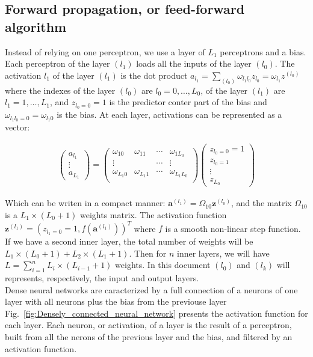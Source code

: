 \documentclass[final, paper=letter,5p,times,twocolumn]{elsarticle}
\begin{document}
\subsection{Forward propagation, or feed-forward algorithm}
Instead of relying on one perceptron, we use a layer of $L_{1}$ perceptrons and a bias. Each perceptron of the layer $(l_{1})$ loads all the inputs of the layer $(l_{0})$. The activation $l_{1}$ of the layer $(l_{1})$ is the dot product $a_{l_{1}} = \sum_{(l_{0})} \omega_{l_{1}l_{0}}z_{l_{0}} = \omega_{l_{1}}z^{(l_{0})}$ where the indexes of the layer $(l_{0})$ are $l_{0} = 0, \dots, L_{0}$, of the layer $(l_{1})$ are $l_{1} = 1, \dots, L_{1}$, and $z_{l_{0} = 0} = 1$ is the predictor conter part of the bias and $\omega_{l_{1}l_{0} = 0} = \omega_{l_{1}0}$ is the bias. At each layer, activations can be represented as a vector:

\begin{eqnarray*}
  \left(
  \begin{array}{c}
    a_{l_{1}} \\
    \vdots \\
    a_{L_{1}}
  \end{array}
  \right) = \left(
  \begin{array}{cccc}
    \omega_{10} & \omega_{11} & \cdots & \omega_{1L_{0}} \\
    \vdots     &            & \cdots & \vdots \\
    \omega_{L_{1}0} & \omega_{L_{1}1} & \cdots & \omega_{L_{1}L_{0}} \\
  \end{array}
  \right)  \left(
  \begin{array}{c}
    z_{l_{0} = 0} = 1 \\
    z_{l_{0} = 1} \\
    \vdots \\
    z_{L_{0}} 
  \end{array}
  \right)
\end{eqnarray*}

Which can be writen in a compact manner: $\bm{a}^{(l_{1})} = \Omega_{10}\bm{z}^{(l_{0})}$, and the matrix $\Omega_{10}$ is a $L_{1}\times(L_{0}+1)$ weights matrix. The activation function $\bm{z}^{(l_{1})} = (z_{l_{1} = 0} = 1, f(\bm{a}^{(l_{1})}))^{T}$ where $f$ is a smooth non-linear step function. If we have a second inner layer, the total number of weights will be $L_{1}\times(L_{0}+1) + L_{2}\times(L_{1}+1)$. Then for $n$ inner layers, we will have $L = \sum_{i = 1}^{n}L_{i}\times(L_{i-1}+1)$ weights. In this document $(l_{0})$ and $(l_{k})$ will represents, respectively, the input and output layers.\\
Dense neural networks are caracterized by a full connection of a neurons of one layer with all neurons plus the bias from the previouse layer Fig.~\ref{fig:Densely_connected_neural_network} presents the activation function for each layer. Each neuron, or activation, of a layer is the result of a perceptron, built from all the nerons of the previous layer and the bias, and filtered by an activation function. 
\end{document}

